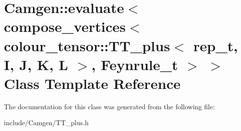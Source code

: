 \hypertarget{a00177}{\section{Camgen\-:\-:evaluate$<$ compose\-\_\-vertices$<$ colour\-\_\-tensor\-:\-:T\-T\-\_\-plus$<$ rep\-\_\-t, I, J, K, L $>$, Feynrule\-\_\-t $>$ $>$ Class Template Reference}
\label{a00177}
}


The documentation for this class was generated from the following file\-:\begin{DoxyCompactItemize}
\item 
include/\-Camgen/T\-T\-\_\-plus.\-h\end{DoxyCompactItemize}
